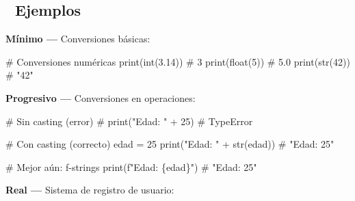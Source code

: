 \documentclass[
  doc,
  floatsintext,
  longtable,
  a4paper,
  nolmodern,
  notxfonts,
  notimes,
  12pt,
  colorlinks=true,linkcolor=blue,citecolor=blue,urlcolor=blue]{apa7}
\newenvironment{Shaded}{\begin{snugshade}}{\end{snugshade}}
\newcommand{\BuiltInTok}[1]{\textcolor[rgb]{0.00,0.23,0.31}{#1}}
\newcommand{\CommentTok}[1]{\textcolor[rgb]{0.37,0.37,0.37}{#1}}
\newcommand{\DecValTok}[1]{\textcolor[rgb]{0.68,0.00,0.00}{#1}}
\newcommand{\FloatTok}[1]{\textcolor[rgb]{0.68,0.00,0.00}{#1}}
\newcommand{\NormalTok}[1]{\textcolor[rgb]{0.00,0.23,0.31}{#1}}
\newcommand{\OperatorTok}[1]{\textcolor[rgb]{0.37,0.37,0.37}{#1}}
\newcommand{\SpecialCharTok}[1]{\textcolor[rgb]{0.37,0.37,0.37}{#1}}
\newcommand{\SpecialStringTok}[1]{\textcolor[rgb]{0.13,0.47,0.30}{#1}}
\newcommand{\StringTok}[1]{\textcolor[rgb]{0.13,0.47,0.30}{#1}}
\begin{document}
\subsection{🔬 Ejemplos}\label{ejemplos}

\textbf{Mínimo ---} Conversiones básicas:

\begin{Shaded}
\begin{Highlighting}[]
\CommentTok{\# Conversiones numéricas}
\BuiltInTok{print}\NormalTok{(}\BuiltInTok{int}\NormalTok{(}\FloatTok{3.14}\NormalTok{))   }\CommentTok{\# 3}
\BuiltInTok{print}\NormalTok{(}\BuiltInTok{float}\NormalTok{(}\DecValTok{5}\NormalTok{))    }\CommentTok{\# 5.0}
\BuiltInTok{print}\NormalTok{(}\BuiltInTok{str}\NormalTok{(}\DecValTok{42}\NormalTok{))     }\CommentTok{\# "42"}
\end{Highlighting}
\end{Shaded}

\textbf{Progresivo ---} Conversiones en operaciones:

\begin{Shaded}
\begin{Highlighting}[]
\CommentTok{\# Sin casting (error)}
\CommentTok{\# print("Edad: " + 25)  \# TypeError}

\CommentTok{\# Con casting (correcto)}
\NormalTok{edad }\OperatorTok{=} \DecValTok{25}
\BuiltInTok{print}\NormalTok{(}\StringTok{"Edad: "} \OperatorTok{+} \BuiltInTok{str}\NormalTok{(edad))  }\CommentTok{\# "Edad: 25"}

\CommentTok{\# Mejor aún: f{-}strings}
\BuiltInTok{print}\NormalTok{(}\SpecialStringTok{f"Edad: }\SpecialCharTok{\{}\NormalTok{edad}\SpecialCharTok{\}}\SpecialStringTok{"}\NormalTok{)  }\CommentTok{\# "Edad: 25"}
\end{Highlighting}
\end{Shaded}

\textbf{Real ---} Sistema de registro de usuario:
\end{document}
